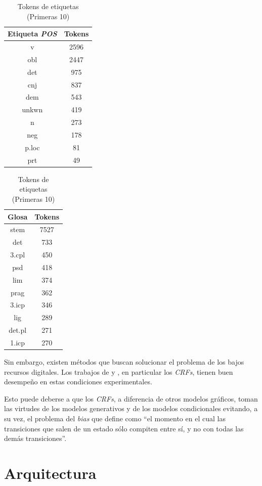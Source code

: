 \documentclass[letterpaper,12pt,oneside]{book}
\theoremstyle{definition}
\begin{document}
\begin{table}[h]
	\centering
	\begin{tabular}{|c | c|}\hline
		\textbf{Etiqueta \textit{POS}} & \textbf{Tokens} \\ \hline
		v & 2596 \\
		obl & 2447 \\
		det & 975 \\
		cnj & 837 \\
		dem & 543 \\
		unkwn & 419 \\
		n & 273 \\
		neg & 178 \\
		p.loc & 81 \\
		prt & 49 \\\hline
	\end{tabular}
	\quad
	\begin{tabular}{|c | c|}\hline                            
		\textbf{Glosa} & \textbf{Tokens} \\ \hline
		stem & 7527 \\
		det & 733 \\
		3.cpl & 450 \\
		psd & 418 \\
		lim & 374 \\
		prag & 362 \\
		3.icp & 346 \\
		lig & 289 \\
		det.pl & 271 \\
		1.icp & 270 \\\hline
	\end{tabular}
	\caption{Tokens de etiquetas (Primeras 10)}
	\label{table_pos_gloss_tokens}
\end{table}

Sin embargo, existen métodos que buscan solucionar el problema de los bajos recursos digitales. Los trabajos de \citet{moeller2018automatic} y \citet{anastasopoulos2018partofspeech}, en particular los \textit{CRFs}, tienen buen desempeño en estas condiciones experimentales.

Esto puede deberse a que los \textit{CRFs}, a diferencia de otros modelos gráficos, toman las virtudes de los modelos generativos y de los modelos condicionales evitando, a su vez, el problema del \textit{bias} que \citet{lafferty2001conditional} define como ``el momento en el cual las transiciones que salen de un estado sólo compiten entre sí, y no con todas las demás transiciones''.

\section{Arquitectura}
\end{document}
